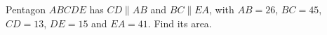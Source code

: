 Pentagon $ABCDE$ has $CD\parallel AB$ and $BC\parallel EA$, with $AB=26$, $BC=45$, $CD=13$, $DE=15$ and $EA=41$. Find its area.
